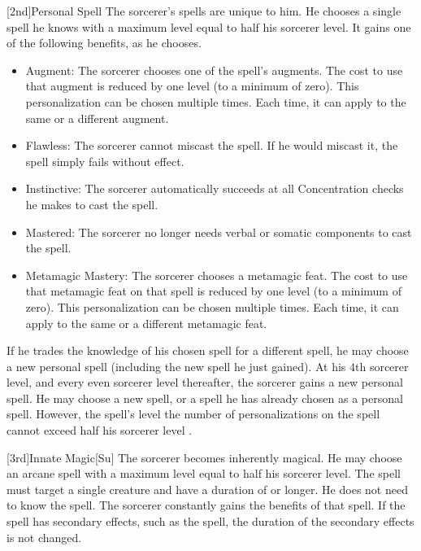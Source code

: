         [2nd]{Personal Spell}
        The sorcerer's spells are unique to him.
        He chooses a single spell he knows with a maximum level equal to half his sorcerer level.
        It gains one of the following benefits, as he chooses.
        \begin{itemize}
            \item Augment: The sorcerer chooses one of the spell's augments.
                The cost to use that augment is reduced by one level (to a minimum of zero).
                This personalization can be chosen multiple times.
                Each time, it can apply to the same or a different augment.
            \item Flawless: The sorcerer cannot miscast the spell.
                If he would miscast it, the spell simply fails without effect.
            \item Instinctive: The sorcerer automatically succeeds at all Concentration checks he makes to cast the spell.
            \item Mastered: The sorcerer no longer needs verbal or somatic components to cast the spell.
            \item Metamagic Mastery: The sorcerer chooses a metamagic feat.
                The cost to use that metamagic feat on that spell is reduced by one level (to a minimum of zero).
                This personalization can be chosen multiple times.
                Each time, it can apply to the same or a different metamagic feat.
        \end{itemize}

        If he trades the knowledge of his chosen spell for a different spell, he may choose a new personal spell (including the new spell he just gained).
        At his 4th sorcerer level, and every even sorcerer level thereafter, the sorcerer gains a new personal spell.
        He may choose a new spell, or a spell he has already chosen as a personal spell.
        However, the spell's level \add the number of personalizations on the spell cannot exceed half his sorcerer level .

        [3rd]{Innate Magic}[Su]
        The sorcerer becomes inherently magical.
        He may choose an arcane spell with a maximum level equal to half his sorcerer level.
        The spell must target a single creature and have a duration of \durshort or longer.
        He does not need to know the spell.
        The sorcerer constantly gains the benefits of that spell.
        If the spell has secondary effects, such as the  spell, the duration of the secondary effects is not changed.


